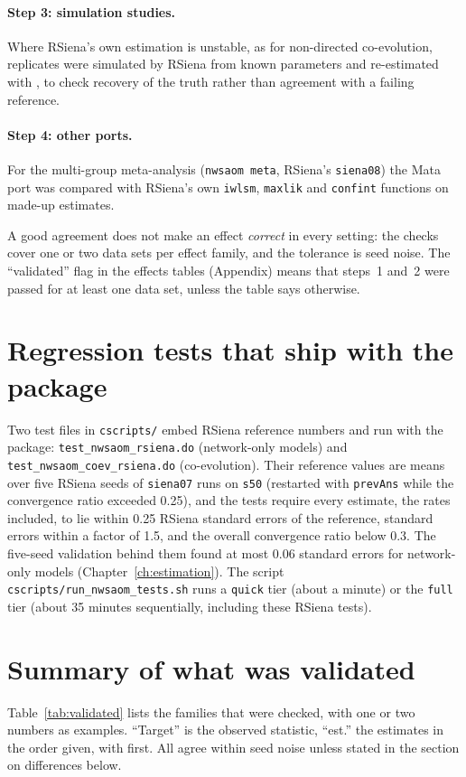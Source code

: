 \paragraph{Step 3: simulation studies.} Where RSiena's own estimation is unstable, as for non-directed co-evolution, replicates were simulated by RSiena from known parameters and re-estimated with \nwsaom{}, to check recovery of the truth rather than agreement with a failing reference.

\paragraph{Step 4: other ports.} For the multi-group meta-analysis (\texttt{nwsaom meta}, RSiena's \texttt{siena08}) the Mata port was compared with RSiena's own \texttt{iwlsm}, \texttt{maxlik} and \texttt{confint} functions on made-up estimates.

A good agreement does not make an effect \emph{correct} in every setting: the checks cover one or two data sets per effect family, and the tolerance is seed noise. The ``validated'' flag in the effects tables (Appendix) means that steps~1 and~2 were passed for at least one data set, unless the table says otherwise.

\section{Regression tests that ship with the package}
Two test files in \texttt{cscripts/} embed RSiena reference numbers and run with the package: \texttt{test\_nwsaom\_rsiena.do} (network-only models) and \texttt{test\_nwsaom\_coev\_rsiena.do} (co-evolution). Their reference values are means over five RSiena seeds of \texttt{siena07} runs on \texttt{s50} (restarted with \texttt{prevAns} while the convergence ratio exceeded 0.25), and the tests require every estimate, the rates included, to lie within 0.25 RSiena standard errors of the reference, standard errors within a factor of 1.5, and the overall convergence ratio below 0.3. The five-seed validation behind them found at most 0.06 standard errors for network-only models (Chapter~\ref{ch:estimation}). The script \texttt{cscripts/run\_nwsaom\_tests.sh} runs a \texttt{quick} tier (about a minute) or the \texttt{full} tier (about 35 minutes sequentially, including these RSiena tests).

\section{Summary of what was validated}
Table~\ref{tab:validated} lists the families that were checked, with one or two numbers as examples. ``Target'' is the observed statistic, ``est.'' the estimates in the order given, with \nwsaom{} first. All agree within seed noise unless stated in the section on differences below.

